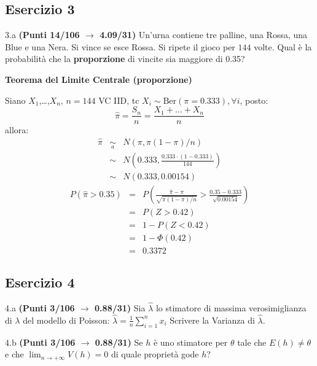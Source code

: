 \documentclass[
  11pt,
]{book}
\theoremstyle{mytheoremstyle}
\theoremstyle{mydefstyle}
\newenvironment{sol}
  {
  \begin{tcolorbox}[enhanced,breakable,arc=0.1mm,boxrule=1pt,colback=white,colframe=iblue,
  title=\bf \fontfamily{lmss}\selectfont \hspace{.5 cm} Soluzione,drop fuzzy shadow]

}{
\end{tcolorbox}
  }
\begin{document}
\subsection{Esercizio 3}\label{esercizio-3-15}

3.a \textbf{(Punti 14/106 \(\rightarrow\) 4.09/31)} Un'urna contiene tre palline, una Rossa, una Blue e una Nera. Si vince
se esce Rossa. Si ripete il gioco per \(144\) volte. Qual è la probabilità che la
\textbf{proporzione} di vincite sia maggiore di 0.35?

\begin{sol}
\textbf{Teorema del Limite Centrale (proporzione)}

Siano \(X_1\),\ldots,\(X_n\), \(n=144\) VC IID, tc \(X_i\sim\text{Ber}(\pi=0.333)\)\(,\forall i\), posto:
\[
      \hat\pi=\frac{S_n}n = \frac{X_1 + ... + X_n}n
      \]
allora:\begin{eqnarray*}
  \hat\pi & \mathop{\sim}\limits_{a}& N(\pi,\pi(1-\pi)/n) \\
  &\sim & N\left(0.333,\frac{0.333\cdot(1-0.333)}{144}\right) \\
     &\sim & N(0.333,0.00154) 
  \end{eqnarray*}\begin{eqnarray*}
      P( \hat\pi   >   0.35 ) 
        &=& P\left(  \frac { \hat\pi  -  \pi }{ \sqrt{\pi(1-\pi)/n} }  >  \frac { 0.35  -  0.333 }{\sqrt{ 0.00154 }} \right)  \\
                 &=& P\left(  Z   >   0.42 \right) \\    &=& 1-P(Z< 0.42 )\\ 
                 &=&  1-\Phi( 0.42 ) \\ &=&  0.3372 
      \end{eqnarray*}

\end{sol}

\subsection{Esercizio 4}\label{esercizio-4-15}

4.a \textbf{(Punti 3/106 \(\rightarrow\) 0.88/31)} Sia \(\hat \lambda\) lo stimatore di massima verosimiglianza di \(\lambda\) del modello di Poisson: \(\hat\lambda =  \frac 1n\sum_{i=1}^nx_i\)
Scrivere la Varianza di \(\hat \lambda\).

4.b \textbf{(Punti 3/106 \(\rightarrow\) 0.88/31)} Se \(h\) è uno stimatore per \(\theta\) tale che
\(E(h)\ne \theta\) e che \(\lim_ {n\to +\infty}V(h)=0\) di quale proprietà gode \(h\)?
\end{document}
